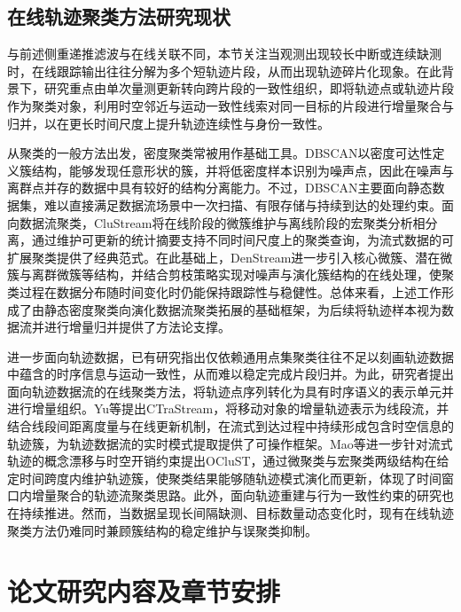 \documentclass{xdupgthesis}
\begin{document}
\subsection{在线轨迹聚类方法研究现状}
与前述侧重递推滤波与在线关联不同，本节关注当观测出现较长中断或连续缺测时，在线跟踪输出往往分解为多个短轨迹片段，从而出现轨迹碎片化现象。在此背景下，研究重点由单次量测更新转向跨片段的一致性组织，即将轨迹点或轨迹片段作为聚类对象，利用时空邻近与运动一致性线索对同一目标的片段进行增量聚合与归并，以在更长时间尺度上提升轨迹连续性与身份一致性\cite{wang2021trajectorysurvey,wang2024reconstruction}。

从聚类的一般方法出发，密度聚类常被用作基础工具。DBSCAN以密度可达性定义簇结构，能够发现任意形状的簇，并将低密度样本识别为噪声点，因此在噪声与离群点并存的数据中具有较好的结构分离能力\cite{ester1996dbscan}。不过，DBSCAN主要面向静态数据集，难以直接满足数据流场景中一次扫描、有限存储与持续到达的处理约束。面向数据流聚类，CluStream将在线阶段的微簇维护与离线阶段的宏聚类分析相分离，通过维护可更新的统计摘要支持不同时间尺度上的聚类查询，为流式数据的可扩展聚类提供了经典范式\cite{aggarwal2003clustream}。在此基础上，DenStream进一步引入核心微簇、潜在微簇与离群微簇等结构，并结合剪枝策略实现对噪声与演化簇结构的在线处理，使聚类过程在数据分布随时间变化时仍能保持跟踪性与稳健性\cite{cao2006denstream}。总体来看，上述工作形成了由静态密度聚类向演化数据流聚类拓展的基础框架，为后续将轨迹样本视为数据流并进行增量归并提供了方法论支撑。

进一步面向轨迹数据，已有研究指出仅依赖通用点集聚类往往不足以刻画轨迹数据中蕴含的时序信息与运动一致性，从而难以稳定完成片段归并。为此，研究者提出面向轨迹数据流的在线聚类方法，将轨迹点序列转化为具有时序语义的表示单元并进行增量组织。Yu等提出CTraStream，将移动对象的增量轨迹表示为线段流，并结合线段间距离度量与在线更新机制，在流式到达过程中持续形成包含时空信息的轨迹簇，为轨迹数据流的实时模式提取提供了可操作框架\cite{yu2013ctra}。Mao等进一步针对流式轨迹的概念漂移与时空开销约束提出OCluST，通过微聚类与宏聚类两级结构在给定时间跨度内维护轨迹簇，使聚类结果能够随轨迹模式演化而更新，体现了时间窗口内增量聚合的轨迹流聚类思路\cite{mao2018oclust}。此外，面向轨迹重建与行为一致性约束的研究也在持续推进\cite{zhao2024behaviouraloc}。然而，当数据呈现长间隔缺测、目标数量动态变化时，现有在线轨迹聚类方法仍难同时兼顾簇结构的稳定维护与误聚类抑制。




\section{论文研究内容及章节安排}
\end{document}
